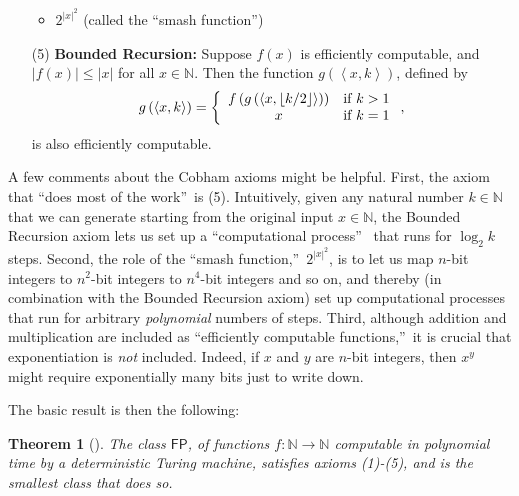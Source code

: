 \documentclass[12pt,onecolumn]{article}%
\newtheorem{theorem}{Theorem}
\begin{document}
\begin{enumerate}
\begin{itemize}
\item $2^{\left\vert x\right\vert ^{2}}$ (called the \textquotedblleft smash
function\textquotedblright )
\end{itemize}

\item[(5)] \textbf{Bounded Recursion:} Suppose $f\left(  x\right)  $ is
efficiently computable, and $\left\vert f\left(  x\right)  \right\vert
\leq\left\vert x\right\vert $ for all $x\in\mathbb{N}$. Then the function
$g\left(  \left\langle x,k\right\rangle \right)  $, defined by%
\[
g\left(  \left\langle x,k\right\rangle \right)  =\left\{
\begin{array}
[c]{cc}%
f\left(  g\left(  \left\langle x,\left\lfloor k/2\right\rfloor \right\rangle
\right)  \right)  & \text{if }k>1\\
x & \text{if }k=1
\end{array}
\right.  ,
\]
is also efficiently computable.
\end{enumerate}

A few comments about the Cobham axioms might be helpful. First, the axiom
that \textquotedblleft does most of the work\textquotedblright\  is (5).
 Intuitively, given any natural number $k\in\mathbb{N}$ that we can generate
starting from the original input $x\in\mathbb{N}$, the Bounded Recursion axiom
lets us set up a \textquotedblleft computational process\textquotedblright\ %
 that runs for $\log_{2}k$ steps. Second, the role of the
\textquotedblleft smash function,\textquotedblright\  $2^{\left\vert
x\right\vert ^{2}}$, is to let us map $n$-bit integers to $n^{2}$-bit integers
to $n^{4}$-bit integers and so on, and thereby (in combination with the
Bounded Recursion axiom) set up computational processes that run for arbitrary
\textit{polynomial} numbers of steps. Third, although addition and
multiplication are included as \textquotedblleft efficiently computable
functions,\textquotedblright\  it is crucial that exponentiation is
\textit{not} included. Indeed, if $x$ and $y$ are $n$-bit integers, then
$x^{y}$ might require exponentially many bits just to write down.

The basic result is then the following:

\begin{theorem}
[\cite{cobham,rose}]\label{cobhamthm}The class $\mathsf{FP}$, of functions
$f:\mathbb{N}\rightarrow\mathbb{N}$ computable in polynomial time by a
deterministic Turing machine, satisfies axioms (1)-(5), and is the smallest
class that does so.
\end{theorem}
\end{document}
